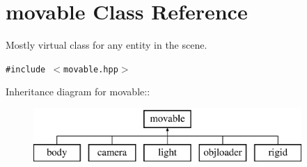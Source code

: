\section{movable  Class Reference}
\label{classmovable}
Mostly virtual class for any entity in the scene. 


{\tt \#include $<$movable.hpp$>$}

Inheritance diagram for movable::\begin{figure}[H]
\begin{center}
\leavevmode
\includegraphics[height=2cm]{classmovable}
\end{center}
\end{figure}
